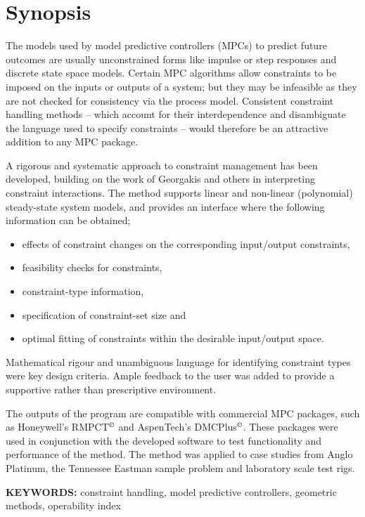 \chapter*{Synopsis}
The models used by model predictive controllers (MPCs) to predict future outcomes are usually unconstrained forms like impulse or step responses and discrete state space models. 
Certain MPC algorithms allow constraints  to be imposed on the inputs or outputs of a system; but they may be infeasible as they are not checked for consistency via the process model. 
Consistent constraint handling methods -- which account for their interdependence and disambiguate the language used to specify constraints -- would therefore be an attractive addition to any MPC package.

A rigorous and systematic approach to constraint management has been developed, building on the work of Georgakis and others in interpreting constraint interactions. 
The method supports linear and non-linear (polynomial) steady-state system models, and provides an interface where the following information can be obtained;
\begin{itemize}
  \item effects of constraint changes on the corresponding input/output constraints,
  \item feasibility checks for constraints,
  \item constraint-type information,
  \item specification of constraint-set size and
  \item optimal fitting of constraints within the desirable input/output space.
\end{itemize}
Mathematical rigour and unambiguous language for identifying constraint types were key design criteria. 
Ample feedback to the user was added to provide a supportive rather than prescriptive environment.

The outputs of the program are compatible with commercial MPC packages, such as Honeywell’s RMPCT$^{\copyright}$ and AspenTech’s DMCPlus$^{\copyright}$.
These packages were used in conjunction with the developed software to test functionality and performance of the method.
The method was applied to case studies from Anglo Platinum, the Tennessee Eastman sample problem and laboratory scale test rigs.
\bigskip

\noindent \textbf{KEYWORDS:} constraint handling, model predictive
controllers, geometric methods, operability index

